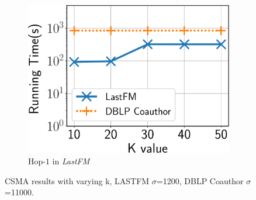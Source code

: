 
\begin{figure}
	\vspace{4mm}
	\centering
	\begin{subfigure}[b]{0.25\textwidth}
		\includegraphics[keepaspectratio,scale=0.25]{img2/lastfm/lastfm_K_var_f.pdf}
		\caption{\scriptsize {\sf Hop-$1$} in {\em LastFM}}
		\label{fig:lastfm_k}
	\end{subfigure}%
	
	\vspace{-2mm}
	\caption{\scriptsize CSMA results with varying k, LASTFM $\sigma$=1200, DBLP Coauthor $\sigma$=11000.}
	\label{fig:approx_k}
	\vspace{-2mm}
\end{figure}


